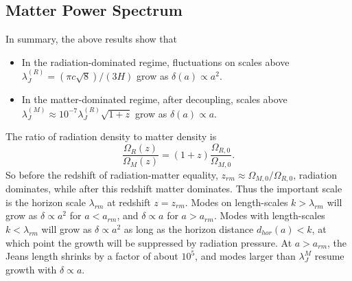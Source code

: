 \subsection{Matter Power Spectrum}
In summary, the above results show that
\begin{itemize}
  \item In the radiation-dominated regime, fluctuations on scales above
    $\lambda_J^{(R)} = (\pi c \sqrt{8})/(3 H)$ grow as
    $\delta(a) \propto a^2$.
  \item In the matter-dominated regime, after decoupling, scales above
    $\lambda_J^{(M)}\approx 10^{-7} \lambda_J^{(R)} \sqrt{1 + z}$
    grow as $\delta(a) \propto a$.
\end{itemize}
The ratio of radiation density to matter density is
\begin{equation}
  \frac{\Omega_R(z)}{\Omega_M(z)} = (1 + z)\frac{\Omega_{R,0}}{\Omega_{M,0}}.
\end{equation}
So before the redshift of radiation-matter equality,
$z_{rm} \approx \Omega_{M,0}/\Omega_{R,0}$, radiation
dominates, while after this redshift matter dominates.
Thus the important scale is the horizon scale $\lambda_{rm}$ at
redshift $z=z_{rm}$.
Modes on length-scales $k > \lambda_{rm}$ will grow as $\delta \propto a^2$
for $a < a_{rm}$, and $\delta \propto a$ for $a > a_{rm}$.  Modes with
length-scales $k < \lambda_{rm}$ will grow as $\delta \propto a^2$ as long
as the horizon distance $d_{hor}(a) < k$, at which point the growth will
be suppressed by radiation pressure.  At $a > a_{rm}$, the Jeans length
shrinks by a factor of about $10^5$, and modes larger than $\lambda_J^{M}$
resume growth with $\delta \propto a$.


